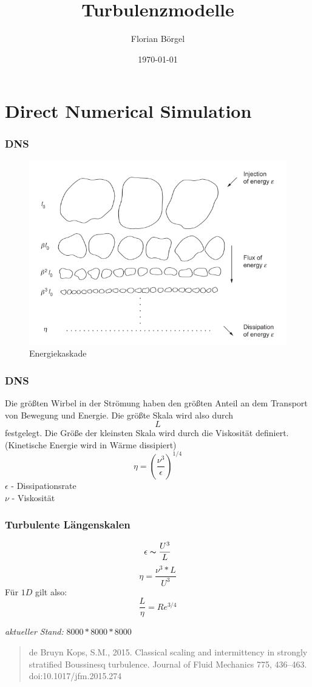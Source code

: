 \documentclass[11pt,t]{beamer}
\title[Theoretische Ozeanographie]{Turbulenzmodelle}
\author[Florian Börgel]{Florian Börgel}
\date{\today}
\institute{Universität Oldenburg}
\begin{document}
\frame{\titlepage}

\section{Direct Numerical Simulation}
\begin{frame}
\frametitle{DNS}
\begin{figure}
\includegraphics[width=0.8\linewidth]{images/cascade.png}
			\caption{Energiekaskade}
\end{figure}
\end{frame}
\begin{frame}
	\frametitle{DNS}
Die größten Wirbel in der Strömung haben den größten Anteil an dem Transport von Bewegung und Energie. Die größte Skala wird also durch 
\begin{equation}
L
\end{equation}
festgelegt. Die Größe der kleinsten Skala wird durch die Viskosität definiert. (Kinetische Energie wird in Wärme dissipiert)
\begin{equation}
\eta = (\frac{\nu^3}{\epsilon})^{1/4}
\end{equation}
\hspace{1cm}$\epsilon$ - Dissipationsrate\\
\hspace{1cm}$\nu$ - Viskosität
\end{frame}


\begin{frame}
	\frametitle{Turbulente Längenskalen}
\begin{equation}
\epsilon\thicksim \frac{U^3}{L}
\end{equation}
\begin{equation}
\eta = \frac{\nu^3 * L}{U^3}
\end{equation}
Für $1D$ gilt also:
\begin{equation}
\frac{L}{\eta} = Re^{3/4} 
\end{equation}

\vspace{0.5cm}
\textit{aktueller Stand:} $8000*8000*8000$

\begin{quote}
de Bruyn Kops, S.M., 2015. Classical scaling and intermittency in
strongly stratified Boussinesq turbulence. Journal of Fluid Mechanics
775, 436–463. doi:10.1017/jfm.2015.274
\end{quote}
\end{frame}
\end{document}
